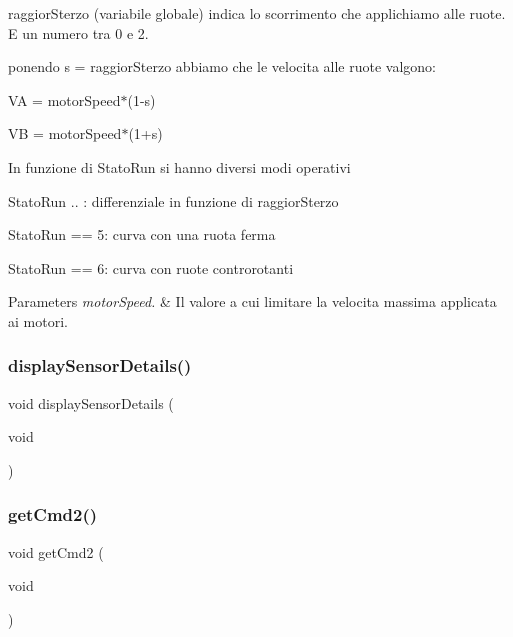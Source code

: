 raggior\+Sterzo (variabile globale) indica lo scorrimento che applichiamo alle ruote. E\textquotesingle{} un numero tra 0 e 2.

ponendo s = raggior\+Sterzo abbiamo che le velocita\textquotesingle{} alle ruote valgono\+:

VA = motor\+Speed$\ast$(1-\/s)

VB = motor\+Speed$\ast$(1+s)

In funzione di Stato\+Run si hanno diversi modi operativi

Stato\+Run .. \+: differenziale in funzione di raggior\+Sterzo

Stato\+Run == 5\+: curva con una ruota ferma

Stato\+Run == 6\+: curva con ruote controrotanti


\begin{DoxyParams}{Parameters}
{\em motor\+Speed.} & Il valore a cui limitare la velocita\textquotesingle{} massima applicata ai motori. \\
\hline
\end{DoxyParams}
\mbox{\label{ari_pi__2_d_c__esp__08_8ino_ac3a1af41d00b96587bf75bad54078a1f}} 
\subsubsection{\texorpdfstring{display\+Sensor\+Details()}{displaySensorDetails()}}
{\footnotesize\ttfamily void display\+Sensor\+Details (\begin{DoxyParamCaption}\item[{void}]{ }\end{DoxyParamCaption})}

\mbox{\label{ari_pi__2_d_c__esp__08_8ino_a64ea2b252b5ab59be204f70e2206ce1c}} 
\subsubsection{\texorpdfstring{get\+Cmd2()}{getCmd2()}}
{\footnotesize\ttfamily void get\+Cmd2 (\begin{DoxyParamCaption}\item[{void}]{ }\end{DoxyParamCaption})}



